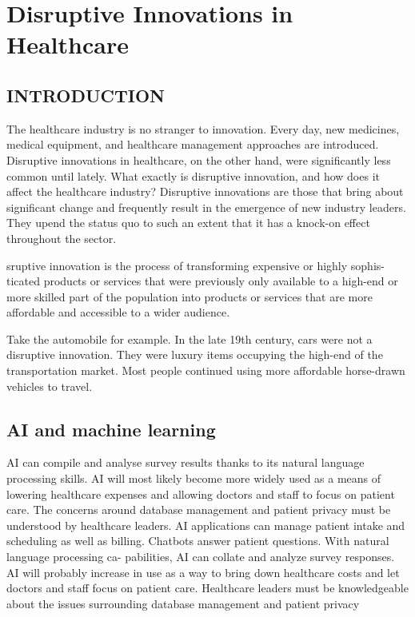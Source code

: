 \documentclass{article}
\begin{document}
\section{Disruptive Innovations in Healthcare}

\subsection{INTRODUCTION}
The healthcare industry is no stranger to innovation. Every day, new medicines,
medical equipment, and healthcare management approaches are introduced.
Disruptive innovations in healthcare, on the other hand, were significantly less
common until lately. What exactly is disruptive innovation, and how does it
affect the healthcare industry? Disruptive innovations are those that bring
about significant change and frequently result in the emergence of new industry
leaders. They upend the status quo to such an extent that it has a knock-on
effect throughout the sector.

sruptive innovation is the process of transforming expensive or highly sophis-
ticated products or services that were previously only available to a high-end
or more skilled part of the population into products or services that are more
affordable and accessible to a wider audience.

Take the automobile for example. In the late 19th century, cars were
not a disruptive innovation. They were luxury items occupying the high-end
of the transportation market. Most people continued using more affordable
horse-drawn vehicles to travel.

\subsection{AI and machine learning}

AI can compile and analyse survey results
thanks to its natural language processing skills. AI will most likely become more
widely used as a means of lowering healthcare expenses and allowing doctors
and staff to focus on patient care. The concerns around database management
and patient privacy must be understood by healthcare leaders.
AI applications can manage patient intake and scheduling as well as billing.
Chatbots answer patient questions. With natural language processing ca-
pabilities, AI can collate and analyze survey responses. AI will probably
increase in use as a way to bring down healthcare costs and let doctors and
staff focus on patient care. Healthcare leaders must be knowledgeable about
the issues surrounding database management and patient privacy
\end{document}
